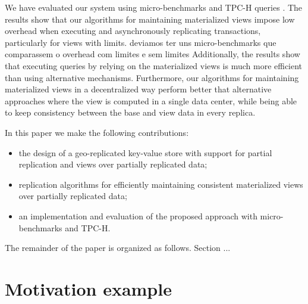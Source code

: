 \documentclass{vldb}
\newcommand{\grumbler}[2]{{\color{red}{\bf #1:} #2}}
\newcommand{\nuno}[1]{\grumbler{nuno}{#1}}
\newcommand{\outline}[1]{}
\begin{document}
We have evaluated our system using micro-benchmarks and TPC-H queries \cite{}.
The results show that our algorithms for maintaining materialized views impose 
low overhead when executing and asynchronously replicating transactions, particularly
for views with limits.
\nuno{deviamos ter uns micro-benchmarks que comparassem o overhead com limites e sem limites}
Additionally, the results show that executing queries by relying on the materialized views is much more 
efficient than using alternative mechanisms.  
Furthermore, our algorithms for maintaining materialized views in a decentralized way perform better 
that alternative approaches where the view is computed in a single data center, while being
able to  keep consistency between the base and view data in every replica.

In this paper we make the following contributions:
\begin{itemize}
	\item the design of a geo-replicated key-value store  with support for partial replication
	and views over partially replicated data; 
	\item replication algorithms for efficiently maintaining consistent materialized views over 
	partially replicated data;
	 \item an implementation and evaluation of the proposed approach with micro-benchmarks
	 and TPC-H.
\end{itemize}

The remainder of the paper is organized as follows. Section ...

\outline{topicos

\begin{itemize}
	\item Num. DC a aumentar
	\item Replicar totalmente tem problemas
	\item Replicação parcial
	\item Queries sobre dados replicados parcialmente
	\begin{itemize}
		\item Standard solution?
	\end{itemize}
	\item Views materializadas replicadas totalmente
	\item Contribuições
\end{itemize}
}

\section{Motivation example}
\label{sec:example}
\end{document}
